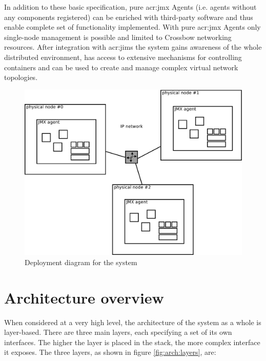 \documentclass[11pt]{book}
\begin{document}
      In addition to these basic specification, pure \gls{acr:jmx} Agents (i.e. agents without any components registered) can be
      enriched with third-party software and thus enable complete set of functionality implemented. With pure \gls{acr:jmx} Agents
      only single-node management is possible and limited to Crossbow networking resources. After integration with \gls{acr:jims}
      the system gains awareness of the whole distributed environment, has access to extensive mechanisms for
      controlling containers and can be used to create and manage complex virtual network topologies.
    
      \begin{figure}[H]
        \begin{center}
          \includegraphics[width=.8\textwidth]{img/architecture/deployment.pdf}
        \end{center}

        \caption{Deployment diagram for the system}
        \label{fig:arch:deployment}
      \end{figure}


    \section{Architecture overview}
    \label{sec:arch:over}

      When considered at a very high level, the architecture of the system as a whole is layer-based. There are three
      main layers, each specifying a set of its own interfaces. The higher the layer is placed in the stack, the more
      complex interface it exposes. The three layers, as shown in figure \ref{fig:arch:layers}, are:
\end{document}
